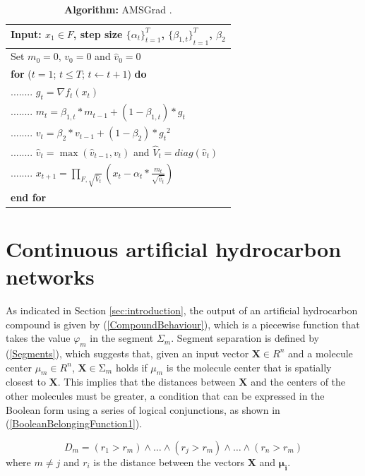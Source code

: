 \documentclass{ieeeaccess}
\begin{document}
\begin{table}[h]
 \centering
 \caption{\textbf{Algorithm:} AMSGrad \cite{tan_convergence_2019}.}\label{table:AMSGrad}
 \begin{tabular}{l }
 \hline
 \textbf{Input:} \(x_1\in F\), step size \({\{\alpha_t\}}_{t=1}^T\), \({\{\beta_{1,t}\}}_{t=1}^T\), \(\beta_2\) \\
 \hline
 Set \(m_0=0\), \(v_0=0\) and \({\hat{v}}_0=0\) \\
 \textbf{for} (\(t=1\); \(t\le T\); \(t\gets t+1\)) \textbf{do} \\
 ........ \(g_t=\nabla f_t(x_t)\) \\
 ........ \(m_t=\beta_{1,t}\ast m_{t-1}+(1-\beta_{1,t})\ast g_t\) \\
 ........ \(v_t=\beta_2\ast v_{t-1}+(1-\beta_2)\ast{g_t}^2\) \\
 ........ \({\hat{v}}_t=\max{\left({\hat{v}}_{t-1},v_t\right)}\) and \({\hat{V}}_t=diag{({\hat{v}}_t)}\) \\
 ........ \(x_{t+1}=\prod_{F,\sqrt{{\hat{V}}_t}}{(x_t-\alpha_t\ast\frac{m_t}{\sqrt{{\hat{v}}_t}})}\) \\
 \textbf{end for} \\
 \hline
 \end{tabular}
\end{table}

\section{Continuous artificial hydrocarbon networks}
\label{sec:continuousahn}

As indicated in Section \ref{sec:introduction}, the output of an artificial hydrocarbon compound is given by (\ref{CompoundBehaviour}), which is a piecewise function that takes the value \(\varphi_m\) in the segment \(\Sigma_m\). Segment separation is defined by (\ref{Segments}), which suggests that, given an input vector \(\mathbf{X}\in R^n\) and a molecule center \(\mu_m\in R^n\), \(\mathbf{X}\in\mathrm{\Sigma}_m\) holds if \(\mu_m\) is the molecule center that is spatially closest to \(\mathbf{X}\). This implies that the distances between \(\mathbf{X}\) and the centers of the other molecules must be greater, a condition that can be expressed in the Boolean form using a series of logical conjunctions, as shown in (\ref{BooleanBelongingFunction1}).

\begin{equation}\label{BooleanBelongingFunction1}
 D_m=(r_1>r_m)\land\ldots\land(r_j>r_m)\land\ldots\land(r_n>r_m)
\end{equation}
where \(m\neq j\) and \(r_i\) is the distance between the vectors \(\mathbf{X}\) and \(\mathbf{\mu_i}\).
\end{document}
